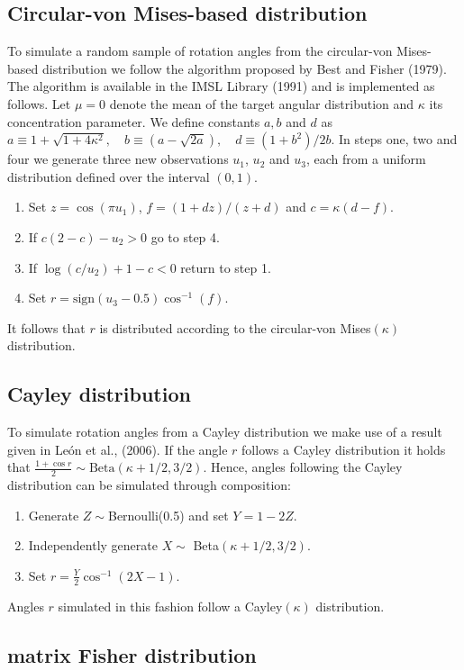 \documentclass[12pt]{article}
\begin{document}
\subsection{Circular-von Mises-based distribution}

To simulate a random sample of rotation angles from the circular-von Mises-based distribution we follow the  algorithm proposed by Best and Fisher (1979).  The algorithm is available in the IMSL Library (1991) and is implemented as follows.  Let $\mu=0$ denote the mean of the target angular distribution and $\kappa$ its concentration parameter.  We define constants $a, b$ and $d$ as
$a\equiv 1+\sqrt{1+4\kappa^2},\quad b\equiv(a-\sqrt{2a}),\quad d\equiv(1+b^2)/2b.$
In steps one, two and four we generate three new observations $u_1$, $u_2$ and $u_3$,  each from a uniform distribution defined over the interval $(0,1)$. 
\begin{enumerate}
\item Set $z=\cos(\pi u_1)$, $f=(1+dz)/(z+d)$ and $c=\kappa(d-f)$.
\item If $c(2-c)-u_2>0$ go to step 4.
\item If $\log(c/u_2)+1-c<0$ return to step 1.
\item Set $r=\text{sign}(u_3-0.5)\cos^{-1}(f).$
\end{enumerate}
It follows that  $r$ is distributed according to the circular-von Mises$(\kappa)$ distribution.

\subsection{Cayley distribution}%

To simulate rotation angles from a Cayley distribution we make use of a result given in Le{\'o}n et al., (2006). If the angle $r$ follows a Cayley distribution it holds that $\frac{1+\cos r}{2} \sim \text{Beta}(\kappa+1/2, 3/2)$.  Hence, angles following the Cayley distribution can be simulated through composition: 
\begin{enumerate}
\item Generate $Z\sim$Bernoulli(0.5) and set  $Y=1-2Z.$
\item Independently generate $X\sim$ Beta$(\kappa+1/2, 3/2).$
\item Set $r= \frac{Y}{2}\cos^{-1}(2X-1).$
\end{enumerate}
Angles $r$ simulated in this fashion follow a Cayley$(\kappa)$ distribution.

\subsection{matrix Fisher distribution}%
\end{document}
